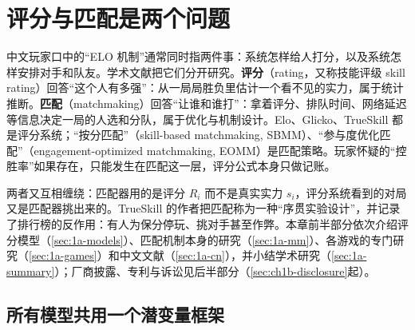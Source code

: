 
\section{评分与匹配是两个问题}\label{sec:1a-frame}

中文玩家口中的“ELO 机制”通常同时指两件事：系统怎样给人打分，以及系统怎样安排对手和队友。学术文献把它们分开研究。\textbf{评分}（rating，又称技能评级 skill rating）回答“这个人有多强”：从一局局胜负里估计一个看不见的实力，属于统计推断。\textbf{匹配}（matchmaking）回答“让谁和谁打”：拿着评分、排队时间、网络延迟等信息决定一局的人选和分队，属于优化与机制设计。Elo、Glicko、TrueSkill 都是评分系统；“按分匹配”（skill-based matchmaking, SBMM）、“参与度优化匹配”（engagement-optimized matchmaking, EOMM）是匹配策略。玩家怀疑的“控胜率”如果存在，只能发生在匹配这一层，评分公式本身只做记账。

两者又互相缠绕：匹配器用的是评分 $R_i$ 而不是真实实力 $s_i$，评分系统看到的对局又是匹配器挑出来的。TrueSkill 的作者把匹配称为一种“序贯实验设计”，并记录了排行榜的反作用：有人为保分停玩、挑对手甚至作弊\cite{herbrich2006trueskill}\tagLit。本章前半部分依次介绍评分模型（\cref{sec:1a-models}）、匹配机制本身的研究（\cref{sec:1a-mm}）、各游戏的专门研究（\cref{sec:1a-games}）和中文文献（\cref{sec:1a-cn}），并小结学术研究（\cref{sec:1a-summary}）；厂商披露、专利与诉讼见后半部分（\cref{sec:ch1b-disclosure}起）。

\subsection{所有模型共用一个潜变量框架}\label{sec:1a-latent}

